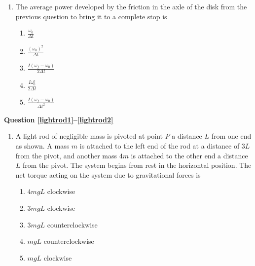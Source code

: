 \documentclass{../../../oss-classkick}
\begin{document}
\begin{multicols}{2}
\begin{enumerate}[leftmargin=18pt]
  \item The average power developed by the friction in the axle of the disk
    from the previous question to bring it to a complete stop is
    \begin{enumerate}[nosep,leftmargin=18pt,label=(\Alph*)]
    \item $\displaystyle\frac{\omega_0}{\Delta t}$
    \item $\displaystyle\frac{(\omega_0)^2}{\Delta t}$
    \item $\displaystyle\frac{I(\omega_f-\omega_0)}{2\Delta t}$
    \item $\displaystyle\frac{I\omega_0^2}{2\Delta t}$
    \item $\displaystyle\frac{I(\omega_f-\omega_0)}{\Delta t^2}$
    \end{enumerate}
    \columnbreak
  \end{enumerate}
  \textbf{Question \ref{lightrod1}--\ref{lightrod2}}
  \begin{enumerate}[leftmargin=18pt,resume]
  \item A light rod of negligible mass is pivoted at point $P$ a distance $L$
    from one end as shown. A mass $m$ is attached to the left end of the rod at
    a distance of $3L$ from the pivot, and another mass $4m$ is attached to the
    other end a distance $L$ from the pivot. The system begins from rest in the
    horizontal position. The net torque acting on the system due to
    gravitational forces is
    \label{lightrod1}
    \begin{center}
    \end{center}
    \begin{enumerate}[nosep,leftmargin=18pt,label=(\Alph*)]
    \item $4mgL$ clockwise
    \item $3mgL$ clockwise
    \item $3mgL$ counterclockwise
    \item $mgL$ counterclockwise
    \item $mgL$ clockwise
    \end{enumerate}
    

\end{enumerate}
\end{multicols}
\end{document}
